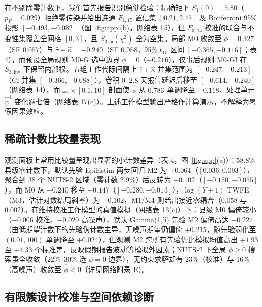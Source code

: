 \documentclass[11pt,a4paper]{ctexart}
\theoremstyle{definition}
\begin{document}
在不剔除零计数下，我们首先报告识别稳健检验：精确矩下 $S_1(0)=5.80$（$p_F=0.029$）拒绝零传染并给出连通 $F_{1,15}$ 置信集 $[0.21,2.45]$ 及 Bonferroni 95\% 投影 $[-0.493,-0.082]$（图~\ref{fig:app}(b)，网络表 15），但 $F_{3,14}$ 校准的联合与不变性集覆盖全网格 $[0,3]$，且 $S_{3,\mathrm{oi}}(\chi^2)$ 全为空集。局部 M0 收敛至 $\hat\phi=0.327$（SE $0.057$）与 $\hat\tau+\hat\kappa=-0.240$（SE $0.058$，95\% $t_{15}$ 区间 $[-0.365,-0.116]$；表 4），而预设全局规则 M0-G 选中边界 $\phi=0$（$-0.216$），仅事后规则 M0-GI 在 $S_{3,\mathrm{inv}}$ 下保留内部根。五组工作代际间隔上 $\hat\tau+\hat\kappa$ 并集范围为 $[-0.247,-0.213]$（CI 并集 $[-0.366,-0.088]$），卷积 $0$--$2.8$ 天报告延迟后移至 $[-0.614,-0.240]$（网络表 14），而 $\omega_i\times[0.1,10]$ 剖面使 $\hat\phi$ 从 $0.783$ 单调降至 $-0.118$、处理单元 $\hat\psi^\dagger$ 变化逾七倍（网络表 17(c)）。上述工作模型输出严格作计算演示，不解释为暑假因果效应。

\subsection{稀疏计数比较量表现}

观测面板上常用比较量呈现出显著的小计数差异（表 4，图~\ref{fig:app}(a)）：58.8\% 县级零计数下，默认先验 EpiEstim 两步回归 M2 为 $+0.064$（$[0.036,0.093]$），聚合到 38 个 NUTS-2 区域（零计数 2.9\%）后反转为 $-0.102$（$[-0.150,-0.055]$），而 M0 从 $-0.240$ 移至 $-0.147$（$[-0.280,-0.013]$），$\log(Y+1)$ TWFE（M3，估计对数结局斜率）为 $-0.102$，M1/M4 则给出接近零耦合（$0.058$ 与 $0.002$）。在维持校准工作模型的真值模拟（网络表 13(c)）下：县级 M0 偏倚较小（$-0.006$ 校准、$-0.020$ 高噪声），默认 Gamma(1,5) 先验 M2 偏倚高达 $+0.227$（由低期望计数下的先验伪计数主导，无噪声期望仍偏倚 $+0.215$，随先验弱化至 $(0.01,100)$ 单调降至 $+0.024$），但观测 M2 跨所有先验仍比模拟均值高出 $+1.93$ 至 $+4.33$ 个标准差，反映假期报告波动等模拟外因素；NUTS-2 下全局 $\phi\ge 0$ 搜索虽全收敛（22\%--30\% 选 $\phi=0$ 边界），无约束求解却有 23\%（校准）与 16\%（高噪声）收敛至 $\hat\phi<0$（详见网络附录 E）。

\subsection{有限簇设计校准与空间依赖诊断}
\end{document}
